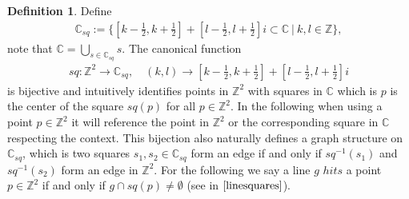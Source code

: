 \documentclass[12pt,a4paper]{scrartcl}
\numberwithin{equation}{subsection}
\newcommand{\C}{\mathbb{C}} %
\newcommand{\1}{\mathbbm{1}}
\numberwithin{equation}{section}
\theoremstyle{definition}
\newtheorem{definition}{Definition}[subsection]
\begin{document}
\begin{definition} \label{squares}
	Define 
	\begin{align}
		\C_{sq} := \{[k - \frac{1}{2}, k + \frac{1}{2}] + [l- \frac{1}{2}, l + \frac{1}{2}]i \subset \C\ |\ k,l \in \mathbb{Z}\}, 
	\end{align} 
	note that $\C = \bigcup_{s\in \C_{sq}} s$. The canonical function
	\begin{align}
	sq: \mathbb{Z}^2 \to \C_{sq},\quad (k,l)\to [k - \frac{1}{2}, k + \frac{1}{2}] + [l- \frac{1}{2}, l + \frac{1}{2}]i
	\end{align}
	is bijective and intuitively identifies points in $\mathbb{Z}^2$ with squares in $\C$ which is $p$ is the center of the square $sq(p)$ for all $p\in \mathbb{Z}^2$. In the following when using a point $p\in \mathbb{Z}^2$ it will reference the point in $\mathbb{Z}^2$ or the corresponding square in $\C$ respecting the context. This bijection also naturally defines a graph structure on $\C_{sq}$, which is two squares $s_1, s_2\in \C_{sq}$ form an edge if and only if $sq^{-1}(s_1)$ and $sq^{-1}(s_2)$ form an edge in $\mathbb{Z}^2$. 
	\noindent For the following we say a line $g$ $hits$ a point $p\in \mathbb{Z}^2$ if and only if $g\cap sq(p) \neq \emptyset$ (see in $\autoref{linesquares}$). 
	
\end{definition}
\end{document}
